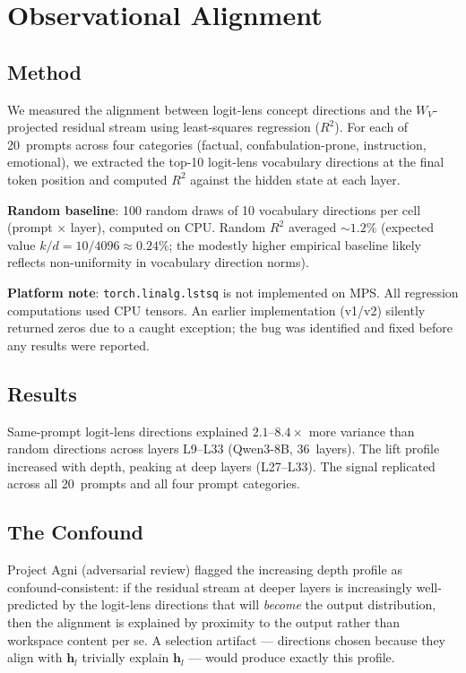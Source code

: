 \documentclass[11pt,a4paper]{article}
\begin{document}
\section{Observational Alignment}
\label{sec:observational}

\subsection{Method}

We measured the alignment between logit-lens concept directions and
the $W_V$-projected residual stream using least-squares regression
($R^2$). For each of 20~prompts across four categories (factual,
confabulation-prone, instruction, emotional), we extracted the
top-10 logit-lens vocabulary directions at the final token position and
computed $R^2$ against the hidden state at each layer.

\textbf{Random baseline}: 100 random draws of 10 vocabulary directions
per cell (prompt $\times$ layer), computed on CPU. Random $R^2$
averaged ${\sim}1.2\%$ (expected value $k/d = 10/4096 \approx 0.24\%$;
the modestly higher empirical baseline likely reflects non-uniformity
in vocabulary direction norms).

\textbf{Platform note}: \texttt{torch.linalg.lstsq} is not implemented
on MPS. All regression computations used CPU tensors. An earlier
implementation (v1/v2) silently returned zeros due to a caught
exception; the bug was identified and fixed before any results were
reported.

\subsection{Results}

Same-prompt logit-lens directions explained $2.1$--$8.4\times$ more
variance than random directions across layers L9--L33 (Qwen3-8B,
36~layers). The lift profile increased with depth, peaking at deep
layers (L27--L33). The signal replicated across all 20~prompts and all
four prompt categories.

\subsection{The Confound}

Project Agni (adversarial review) flagged the increasing depth profile
as confound-consistent: if the residual stream at deeper layers is
increasingly well-predicted by the logit-lens directions that will
\emph{become} the output distribution, then the alignment is explained
by proximity to the output rather than workspace content per se. A
selection artifact --- directions chosen because they align with
$\mathbf{h}_l$ trivially explain $\mathbf{h}_l$ --- would produce
exactly this profile.
\end{document}

